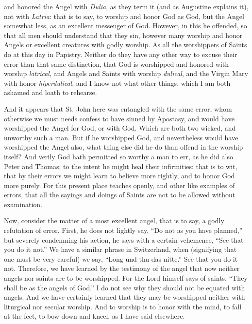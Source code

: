 and honored the Angel with \textit{Dulia}, as they term it (and as Augustine explains it), not with \textit{Latria}: that is to say, to worship and honor God as God, but the Angel somewhat less, as an excellent messenger of God. However, in this he offended, so that all men should understand that they sin, however many worship and honor Angels or excellent creatures with godly worship. As all the worshippers of Saints do at this day in Papistry. Neither do they have any other way to excuse their error than that same distinction, that God is worshipped and honored with worship \textit{latrical}, and Angels and Saints with worship \textit{dulical}, and the Virgin Mary with honor \textit{hiperdulical}, and I know not what other things, which I am both ashamed and loath to rehearse.

And it appears that St. John here was entangled with the same error, whom otherwise we must needs confess to have sinned by Apostasy, and would have worshipped the Angel for God, or with God. Which are both two wicked, and unworthy such a man. But if he worshipped God, and nevertheless would have worshipped the Angel also, what thing else did he do than offend in the worship itself? And verily God hath permitted so worthy a man to err, as he did also Peter and Thomas; to the intent he might heal their infirmities: that is to wit, that by their errors we might learn to believe more rightly, and to honor God more purely. For this present place teaches openly, and other like examples of errors, that all the sayings and doings of Saints are not to be allowed without examination.

Now, consider the matter of a most excellent angel, that is to say, a godly refutation of error. First, he does not lightly say, “Do not as you have planned,” but severely condemning his action, he says with a certain vehemence, “See that you do it not.” We have a similar phrase in Switzerland, when (signifying that one must be very careful) we say, “Long und thu das nitte.” See that you do it not. Therefore, we have learned by the testimony of the angel that now neither angels nor saints are to be worshipped. For the Lord himself says of saints, “They shall be as the angels of God.” I do not see why they should not be equated with angels. And we have certainly learned that they may be worshipped neither with liturgical nor secular worship. And to worship is to honor with the mind, to fall at the feet, to bow down and kneel, as I have said elsewhere.


